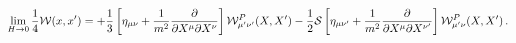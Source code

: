 \begin{equation}
\lim_{H\rightarrow 0}\frac{1}{4}{\cal W}(x,x')= +\frac{1}{3}
\left[ \eta_{\mu\nu}+\frac{1}{m^{2}} \frac{\partial}{\partial
X^{\mu}\partial X^{\nu}}\right]{\cal
W}_{\mu'\nu'}^{P}(X,X')-\frac{1}{2}{\cal S} \left[
\eta_{\mu\nu'}+\frac{1}{m^{2}} \frac{\partial}{\partial
X^{\mu}\partial X^{\nu'}}\right] {\cal W}_{\mu'\nu}^{P}(X,X')\,.
\end{equation}

